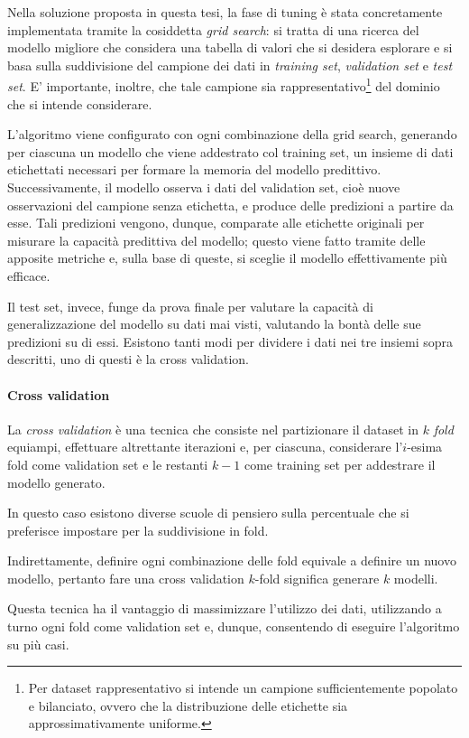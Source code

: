 \documentclass[12pt]{report}
\theoremstyle{definition}
\begin{document}
Nella soluzione proposta in questa tesi, la fase di tuning è stata concretamente implementata tramite la cosiddetta \textit{grid search}: si tratta di una ricerca del modello migliore che considera una tabella di valori che si desidera esplorare e si basa sulla suddivisione del campione dei dati in \textit{training set}, \textit{validation set} e \textit{test set}.
E' importante, inoltre, che tale campione sia rappresentativo\footnote{Per dataset rappresentativo si intende un campione sufficientemente popolato e bilanciato, ovvero che la distribuzione delle etichette sia approssimativamente uniforme.} del dominio che si intende considerare.

L'algoritmo viene configurato con ogni combinazione della grid search, generando per ciascuna un modello che viene addestrato col training set, un insieme di dati etichettati necessari per formare la memoria del modello predittivo. Successivamente, il modello osserva i dati del validation set, cioè nuove osservazioni del campione senza etichetta, e produce delle predizioni a partire da esse. Tali predizioni vengono, dunque, comparate alle etichette originali per misurare la capacità predittiva del modello; questo viene fatto tramite delle apposite metriche e, sulla base di queste, si sceglie il modello effettivamente più efficace.

Il test set, invece, funge da prova finale per valutare la capacità di generalizzazione del modello su dati mai visti, valutando la bontà delle sue predizioni su di essi.
Esistono tanti modi per dividere i dati nei tre insiemi sopra descritti, uno di questi è la cross validation.


\paragraph{Cross validation} 
La \textit{cross validation} è una tecnica che consiste nel partizionare il dataset in $k$ \textit{fold} equiampi, effettuare altrettante iterazioni e, per ciascuna, considerare l'$i$-esima fold come validation set e le restanti $k-1$ come training set per addestrare il modello generato.

In questo caso esistono diverse scuole di pensiero sulla percentuale che si preferisce impostare per la suddivisione in fold.

Indirettamente, definire ogni combinazione delle fold equivale a definire un nuovo modello, pertanto fare una cross validation $k$-fold significa generare $k$ modelli.

Questa tecnica ha il vantaggio di massimizzare l'utilizzo dei dati, utilizzando a turno ogni fold come validation set e, dunque, consentendo di eseguire l'algoritmo su più casi.
\end{document}
